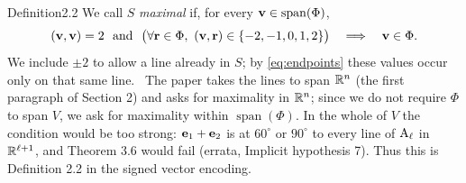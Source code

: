 \begin{cgss}{Definition}{2.2}\label{def:2.2}
 We call $S$ \emph{maximal} if, for every ${\mathbf v}\in\operatorname{span}(\Phi)$,
 \[
 ({\mathbf v},{\mathbf v})=2\ \text{ and }\
 \bigl(\forall{\mathbf r}\in\Phi,\ ({\mathbf v},{\mathbf r})\in\{-2,-1,0,1,2\}\bigr)
 \quad\Longrightarrow\quad {\mathbf v}\in\Phi.
 \]
 We include $\pm2$ to allow a line already in $S$; by \eqref{eq:endpoints} these values
 occur only on that same line. \repair\ The paper takes the lines to span ${\mathbb R}^n$ (the first
 paragraph of Section 2) and asks for maximality in ${\mathbb R}^n$; since we do not require $\Phi$ to
 span $V$, we ask for maximality within $\operatorname{span}(\Phi)$. In the whole of $V$ the
 condition would be too strong: ${\mathbf e}_1+{\mathbf e}_2$ is at $60^\circ$ or $90^\circ$ to every line of
 $\mathrm{A}_\ell$ in ${\mathbb R}^{\ell+1}$, and Theorem 3.6 would fail (errata, Implicit hypothesis 7). Thus this is
 Definition 2.2 in the signed vector encoding.
\end{cgss}

